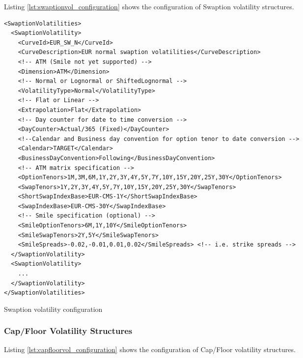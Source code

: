 \documentclass[12pt, a4paper]{article}
\newenvironment{longlisting}{\captionsetup{type=listing}}{}
\begin{document}
Listing \ref{lst:swaptionvol_configuration} shows the configuration of Swaption volatility structures.

\begin{longlisting}
\begin{verbatim}
<SwaptionVolatilities>    
  <SwaptionVolatility>
    <CurveId>EUR_SW_N</CurveId>
    <CurveDescription>EUR normal swaption volatilities</CurveDescription>
    <!-- ATM (Smile not yet supported) -->
    <Dimension>ATM</Dimension>
    <!-- Normal or Lognormal or ShiftedLognormal -->
    <VolatilityType>Normal</VolatilityType>
    <!-- Flat or Linear -->
    <Extrapolation>Flat</Extrapolation>
    <!-- Day counter for date to time conversion -->
    <DayCounter>Actual/365 (Fixed)</DayCounter>
    <!--Calendar and Business day convention for option tenor to date conversion -->
    <Calendar>TARGET</Calendar>
    <BusinessDayConvention>Following</BusinessDayConvention>
    <!-- ATM matrix specification -->
    <OptionTenors>1M,3M,6M,1Y,2Y,3Y,4Y,5Y,7Y,10Y,15Y,20Y,25Y,30Y</OptionTenors>
    <SwapTenors>1Y,2Y,3Y,4Y,5Y,7Y,10Y,15Y,20Y,25Y,30Y</SwapTenors>
    <ShortSwapIndexBase>EUR-CMS-1Y</ShortSwapIndexBase>
    <SwapIndexBase>EUR-CMS-30Y</SwapIndexBase>
    <!-- Smile specification (optional) -->
    <SmileOptionTenors>6M,1Y,10Y</SmileOptionTenors>
    <SmileSwapTenors>2Y,5Y</SmileSwapTenors>
    <SmileSpreads>-0.02,-0.01,0.01,0.02</SmileSpreads> <!-- i.e. strike spreads -->
  </SwaptionVolatility>
  <SwaptionVolatility>
    ...
  </SwaptionVolatility>
</SwaptionVolatilities>
\end{verbatim}
\caption{Swaption volatility configuration}
\label{lst:swaptionvol_configuration}
\end{longlisting}

\subsubsection{Cap/Floor Volatility Structures}

Listing \ref{lst:capfloorvol_configuration} shows the configuration of Cap/Floor volatility structures.
\end{document}
